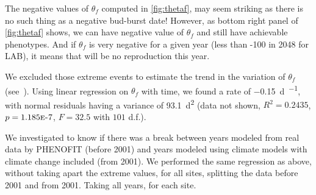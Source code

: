 The negative values of $\theta_f$ computed in \autoref{fig:thetaf}, may seem striking as there is no such thing as a negative bud-burst date! However, as bottom right panel of \autoref{fig:thetaf} shows, we can have negative value of $\theta_f$ and still have achievable phenotypes. And if $\theta_f$ is very negative for a given year (less than -100 in 2048 for LAB), it means that will be no reproduction this year.

We excluded those extreme events to estimate the trend in the variation of $\theta_f$ (see~). Using linear regression on $\theta_f$ with time, we found a rate of \SI{-0.15}{\day\per\year}, with normal residuals having a variance of \SI{93.1}{\day\squared} (data not shown, $R^2=0.2435$, $p=1.185\text{\sc{e}-}7$, $F=32.5$ with $101$ d.f.).

We investigated to know if there was a break between years modeled from real data by \textsc{PHENOFIT} (before 2001) and years modeled using climate models with climate change included (from 2001). We performed the same regression as above, without taking apart the extreme values, for all sites, splitting the data before 2001 and from 2001. Taking all years, for each site.